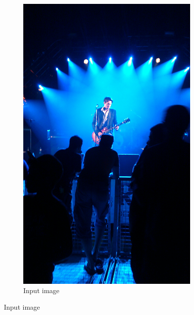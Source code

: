 \documentclass[a4paper]{article}
\begin{document}
\begin{figure}[H]
	\begin{subfigure}[h]{0.24\textwidth}
		\centering
		\includegraphics[width=\textwidth]{concert}
		\caption*{Input image}
	\end{subfigure}
	

\end{figure}
\end{document}
